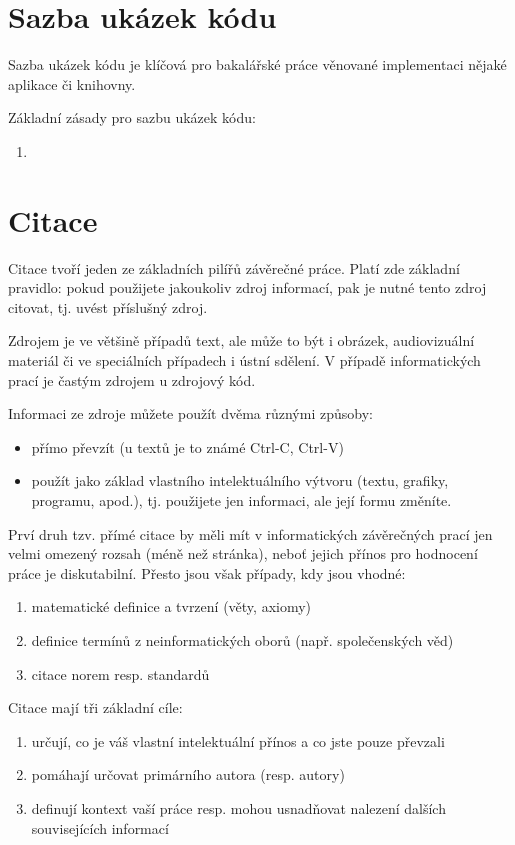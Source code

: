 \documentclass[male,czech,api_bc]{kitheses}
\begin{document}
\chapter{Sazba ukázek kódu}

Sazba ukázek kódu je klíčová pro bakalářské práce věnované implementaci nějaké aplikace či knihovny.

Základní zásady pro sazbu ukázek kódu:

\begin{enumerate}
\item 
\end{enumerate}

\chapter{Citace}

Citace tvoří jeden ze základních pilířů závěrečné práce. Platí zde základní pravidlo: pokud použijete 
jakoukoliv zdroj informací, pak je nutné tento zdroj citovat, tj. uvést příslušný zdroj.

Zdrojem je ve většině případů text, ale může to být i obrázek, audiovizuální materiál či ve speciálních případech i ústní sdělení. V případě informatických prací je častým zdrojem u zdrojový kód.

Informaci ze zdroje můžete použít dvěma různými způsoby:

\begin{itemize}
\item přímo převzít (u textů je to známé Ctrl-C, Ctrl-V)
\item použít jako základ vlastního intelektuálního výtvoru (textu, grafiky, programu, apod.), tj. použijete jen informaci, ale její formu změníte.
\end{itemize}

Prví druh tzv. přímé citace by měli mít v informatických závěrečných prací jen velmi omezený rozsah (méně než stránka), neboť jejich přínos pro hodnocení práce je diskutabilní. Přesto jsou však případy, kdy jsou vhodné:

\begin{enumerate}
\item matematické definice a tvrzení (věty, axiomy)
\item definice termínů z neinformatických oborů (např. společenských věd)
\item citace norem resp. standardů
\end{enumerate} 

Citace mají tři základní cíle:
\begin{enumerate}
\item určují, co je váš vlastní intelektuální přínos a co jste pouze převzali
\item pomáhají určovat primárního autora (resp. autory)
\item definují kontext vaší práce resp. mohou usnadňovat nalezení dalších souvisejících informací
\end{enumerate}
\end{document}
